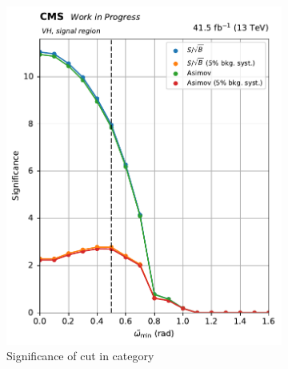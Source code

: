 \begin{figure}[htbp]
\begin{subfigure}[b]{0.27\textwidth}
        \includegraphics[width=\textwidth]{figures/category_optimisations/significance_VH_min_omega_tilde_all.pdf}
        \caption{Significance of cut in \VH category}
    \end{subfigure}
    \hfill
    \begin{subfigure}[b]{0.27\textwidth}

\end{subfigure}
\end{figure}
